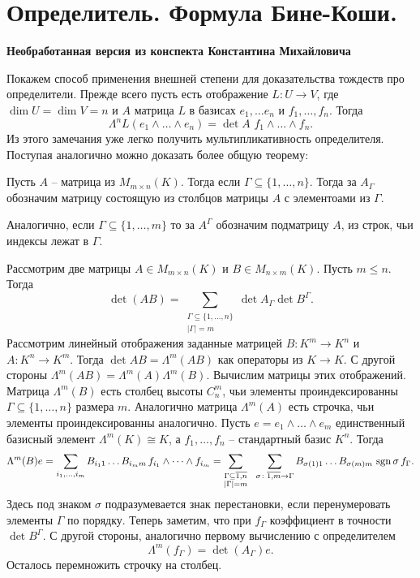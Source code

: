 \section{ Определитель. Формула Бине-Коши.}

\textbf{Необработанная версия из конспекта Константина Михайловича}


Покажем способ применения внешней степени для доказательства тождеств про определители. Прежде всего пусть есть отображение $L \colon U \to V$, где $\dim U= \dim V = n$ и $A$ матрица $L$ в базисах $e_1,\dots e_n$ и $f_1,\dots,f_n$. Тогда $$\Lambda^n L(e_1\wedge \dots \wedge e_n) = \det A \,\,f_1 \wedge \dots \wedge f_n.$$
Из этого замечания уже легко получить мультипликативность определителя. Поступая аналогично можно доказать более общую теорему:

\dfn Пусть $A$ -- матрица из $M_{m\times n}(K)$. Тогда если $\Gamma \subseteq \{1,\dots,n\}$. Тогда за $A_{\Gamma}$ обозначим матрицу состоящую из столбцов матрицы $A$ с элементоами из $\Gamma$.

Аналогично, если $\Gamma \subseteq \{1,\dots,m\}$ то за $A^{\Gamma}$ обозначим подматрицу $A$, из строк, чьи индексы лежат в $\Gamma$.
\edfn

 Рассмотрим две матрицы $A\in M_{m\times n}(K)$ и $B\in M_{n\times m}(K)$. Пусть $m\leq n$. Тогда
$$\det(AB)=\sum_{\substack{\Gamma \subseteq \{1,\dots,n\}\\ |\Gamma|=m}} \det A_{\Gamma} \det B^{\Gamma}.$$
\proof Рассмотрим линейный отображения заданные матрицей $B \colon K^m \to K^n$ и $A\colon K^n \to K^m$. Тогда $\det AB = \Lambda^m (AB)$ как операторы из $K \to K$. С другой стороны $\Lambda^m(AB)=\Lambda^m(A) \Lambda^m(B)$. Вычислим матрицы этих отображений. Матрица $\Lambda^m(B)$ есть столбец высоты $C_n^m$, чьи элементы проиндексированны $\Gamma \subseteq \{1,\dots,n\}$ размера $m$. Аналогично матрица $\Lambda^m(A)$  есть строчка, чьи элементы проиндексированны аналогично.
Пусть $e=e_1\wedge \dots \wedge e_m$ единственный базисный элемент $\Lambda^m(K)\cong K$, а $f_1,\dots,f_n$ -- стандартный базис $K^n$. Тогда 
$$\Lambda^m(B)e= \sum_{i_1,\dots,i_m} B_{i_1 1}\dots B_{i_m m} \,f_{i_1}\wedge \dots \wedge f_{i_m}=\sum_{\substack{\Gamma \subseteq \overline{1,n} \\ |\Gamma|=m}}\,\,\,\, \sum_{\sigma\colon \overline{1,m} \to \Gamma} B_{\sigma(1)1}\dots B_{\sigma(m)m}\,\operatorname{sgn}{\sigma}\,f_{\Gamma}.$$
Здесь под знаком $\sigma$ подразумевается знак перестановки, если перенумеровать элементы $\Gamma$ по порядку. Теперь заметим, что при $f_{\Gamma}$ коэффициент в точности $\det B^{\Gamma}$. С другой стороны, аналогично первому вычислению с определителем
$$\Lambda^m(f_{\Gamma})=\det(A_{\Gamma})e.$$
Осталось перемножить строчку на столбец.
\endproof
\ethrm

